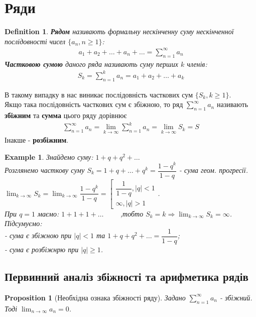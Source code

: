 \documentclass[a4paper, 10pt]{article}
\def\huge{\displaystyle}
\theoremstyle{theoremdd}
\theoremstyle{theoremdd}
\theoremstyle{theoremdd}
\newtheorem{definition}[theorem]{Definition}
\theoremstyle{theoremdd}
\theoremstyle{theoremdd}
\newtheorem{example}[theorem]{Example}
\theoremstyle{theoremdd}
\newtheorem{proposition}[theorem]{Proposition}
\theoremstyle{theoremdd}
\theoremstyle{theoremdd}
\theoremstyle{theoremdd}
\begin{document}
\section{Ряди}
\begin{definition} 
\textbf{Рядом} називають формальну нескінченну суму нескінченної послідовності чисел $\{a_n, n \geq 1\}$:
\begin{align*}
a_1 + a_2 + \dots + a_n + \dots = \huge \sum_{n=1}^{\infty} a_n
\end{align*}
\textbf{Частковою сумою} даного ряда називають суму перших $k$ членів:
\begin{align*}
S_k = \sum_{n=1}^k a_n = a_1 + a_2 + \dots + a_k
\end{align*}
\end{definition}
В такому випадку в нас виникає послідовність часткових сум $\{S_k, k \geq 1\}$.\\
Якщо така послідовність часткових сум є збіжною, то ряд $\huge \sum_{n=1}^{\infty} a_n$ називають \textbf{збіжним} та \textbf{сумма} цього ряду дорівнює
\begin{align*}
\sum_{n=1}^{\infty} a_n = \lim_{k \to \infty} \sum_{n=1}^k a_n = \lim_{k \to \infty} S_k = S
\end{align*}
Інакше - \textbf{розбіжним}.

\begin{example}
Знайдемо суму: $1 + q + q^2 + \dots$\\
Розглянемо часткову суму $S_k = 1 + q + \dots + q^k = \dfrac{1 - q^k}{1 - q}$ - сума геом. прогресії.\\
$\huge \lim_{k \to \infty} S_k = \lim_{k \to \infty} \dfrac{1-q^k}{1 - q} = \left[ \begin{gathered} \dfrac{1}{1-q}, |q|<1 \\ \infty, |q|>1 \end{gathered} \right.$.
\\
При $q = 1$ маємо: $1 + 1 + 1 + \dots \hspace{1cm}$,тобто $S_k = k \Rightarrow \huge \lim_{k \to \infty} S_k = \infty$.\\
Підсумуємо:\\
- сума є збіжною при $|q| < 1$ та $1 + q + q^2 + \dots = \dfrac{1}{1-q}$;\\
- сума є розбіжнрю при $|q| \geq 1$.
\end{example}

\subsection{Первинний аналіз збіжності та арифметика рядів}
\begin{proposition}[Необхідна ознака збіжності ряду]
Задано $\huge \sum_{n=1}^{\infty} a_n$ - збіжний. Тоді $\huge \lim_{n \to \infty} a_n = 0$.
\end{proposition}
\end{document}
